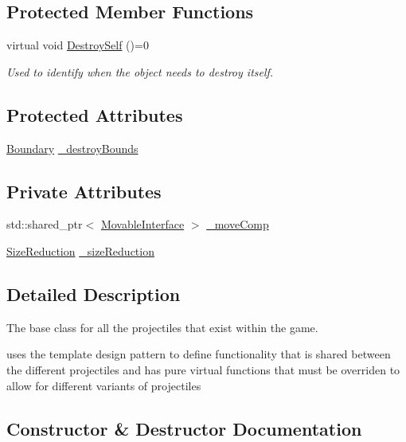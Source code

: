 \subsection*{Protected Member Functions}
\begin{DoxyCompactItemize}
\item 
virtual void \hyperlink{class_projectile_ab2f4025b6f9b5caa20e0a4c5c248d603}{Destroy\+Self} ()=0
\begin{DoxyCompactList}\small\item\em Used to identify when the object needs to destroy itself. \end{DoxyCompactList}\end{DoxyCompactItemize}
\subsection*{Protected Attributes}
\begin{DoxyCompactItemize}
\item 
\hyperlink{class_boundary}{Boundary} \hyperlink{class_projectile_a2904a8119d6703c781e4d54c345b75b7}{\+\_\+destroy\+Bounds}
\end{DoxyCompactItemize}
\subsection*{Private Attributes}
\begin{DoxyCompactItemize}
\item 
std\+::shared\+\_\+ptr$<$ \hyperlink{class_movable_interface}{Movable\+Interface} $>$ \hyperlink{class_projectile_afd6f6c2b3c202adb129a9cbfcd62ea1f}{\+\_\+move\+Comp}
\item 
\hyperlink{class_size_reduction}{Size\+Reduction} \hyperlink{class_projectile_adaf2c52cd2491197174be5a5faeca052}{\+\_\+size\+Reduction}
\end{DoxyCompactItemize}


\subsection{Detailed Description}
The base class for all the projectiles that exist within the game. 

uses the template design pattern to define functionality that is shared between the different projectiles and has pure virtual functions that must be overriden to allow for different variants of projectiles 

\subsection{Constructor \& Destructor Documentation}
\mbox{\label{class_projectile_a4ff1ec79a15e7821ac5ccfd6dda9205f}} 
